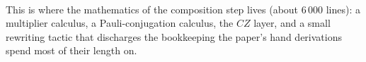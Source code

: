 \begin{code}%
\>[0]\AgdaSpace{}%
\AgdaSymbol{:}\AgdaSpace{}%
\AgdaSpace{}%
\AgdaSymbol{\{}\AgdaSymbol{\}}\AgdaSpace{}%
\<%
\\
\>[0][@{}l@{\AgdaIndent{0}}]%
\>[2]\AgdaSymbol{(}\AgdaSpace{}%
\AgdaSymbol{)}\AgdaSpace{}%
\AgdaSpace{}%
\AgdaSymbol{(}\AgdaSpace{}%
\AgdaSymbol{)}\<%
\end{code}
\begin{code}[hide]%
\>[0]\AgdaSpace{}%
\AgdaSymbol{=}\AgdaSpace{}%
\<%
\end{code}

This is where the mathematics of the composition step lives (about
6\,000 lines): a multiplier calculus, a Pauli-conjugation calculus, the
$CZ$ layer, and a small rewriting tactic that discharges the
bookkeeping the paper's hand derivations spend most of their length
on.

